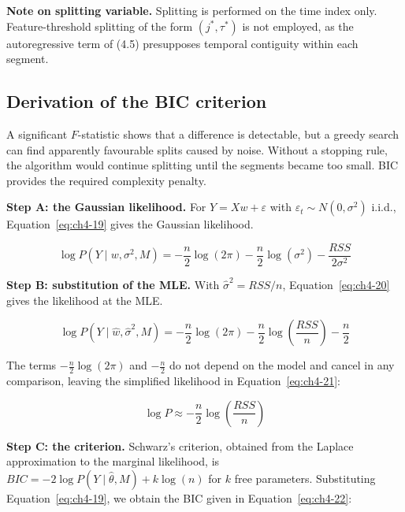 \textbf{Note on splitting variable.} Splitting is performed on the time index only.
Feature-threshold splitting of the form $(j^*, \tau^*)$ is not employed, as the
autoregressive term of (4.5) presupposes temporal contiguity within each segment.


\subsection{Derivation of the BIC criterion}

A significant $F$-statistic shows that a difference is detectable, but a greedy search
can find apparently favourable splits caused by noise. Without a stopping rule, the
algorithm would continue splitting until the segments became too small. BIC provides
the required complexity penalty.

\textbf{Step A: the Gaussian likelihood.} For $Y = Xw + \varepsilon$ with
$\varepsilon_t \sim N(0,\sigma^2)$ i.i.d., Equation~\eqref{eq:ch4-19} gives the Gaussian likelihood.

\begin{equation}
    \label{eq:ch4-19}
\log P(Y \mid w, \sigma^2, M) = -\frac{n}{2}\log(2\pi) - \frac{n}{2}\log(\sigma^2) - \frac{RSS}{2\sigma^2}
\end{equation}

\textbf{Step B: substitution of the MLE.} With $\hat\sigma^2 = RSS/n$, Equation~\eqref{eq:ch4-20} gives the likelihood at the MLE.

\begin{equation}
    \label{eq:ch4-20}
\log P(Y \mid \hat{w}, \hat\sigma^2, M) = -\frac{n}{2}\log(2\pi) - \frac{n}{2}\log\!\left(\frac{RSS}{n}\right) - \frac{n}{2}
\end{equation}

The terms $-\frac{n}{2}\log(2\pi)$ and $-\frac{n}{2}$ do not depend on the model and
cancel in any comparison, leaving the simplified likelihood in Equation~\eqref{eq:ch4-21}:

\begin{equation}
    \label{eq:ch4-21}
\log P \approx -\frac{n}{2}\log\!\left(\frac{RSS}{n}\right)
\end{equation}

\textbf{Step C: the criterion.} Schwarz's criterion, obtained from the Laplace
approximation to the marginal likelihood, is $BIC = -2\log P(Y \mid \hat\theta, M) + k\log(n)$
for $k$ free parameters. Substituting Equation~\eqref{eq:ch4-19}, we obtain the BIC
given in Equation~\eqref{eq:ch4-22}:

